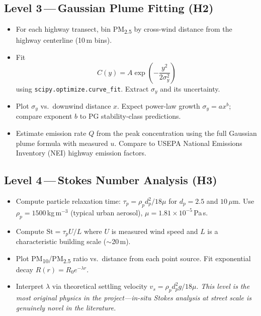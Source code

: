 \documentclass[11pt, letterpaper]{article}
\begin{document}
\subsection{Level 3\,---\,Gaussian Plume Fitting (H2)}
\begin{itemize}
  \item For each highway transect, bin PM\textsubscript{2.5} by cross-wind distance from the highway centerline (10\,m bins).
  \item Fit
  \[
    C(y) = A \exp\!\left(-\frac{y^2}{2\sigma_y^2}\right)
  \]
  using \texttt{scipy.optimize.curve\_fit}. Extract $\sigma_y$ and its uncertainty.
  \item Plot $\sigma_y$ vs.\ downwind distance $x$. Expect power-law growth $\sigma_y = ax^b$; compare exponent $b$ to PG stability-class predictions.
  \item Estimate emission rate $Q$ from the peak concentration using the full Gaussian plume formula with measured $u$. Compare to USEPA National Emissions Inventory (NEI) highway emission factors.
\end{itemize}

\subsection{Level 4\,---\,Stokes Number Analysis (H3)}
\begin{itemize}
  \item Compute particle relaxation time: $\tau_p = \rho_p d_p^2 / 18\mu$ for $d_p = 2.5$ and $10\,\mu$m. Use $\rho_p = 1500$\,kg\,m$^{-3}$ (typical urban aerosol), $\mu = 1.81\times10^{-5}$\,Pa\,s.
  \item Compute $\mathrm{St} = \tau_p U / L$ where $U$ is measured wind speed and $L$ is a characteristic building scale ($\sim$20\,m).
  \item Plot PM\textsubscript{10}/PM\textsubscript{2.5} ratio vs.\ distance from each point source. Fit exponential decay $R(r) = R_0 e^{-\lambda r}$.
  \item Interpret $\lambda$ via theoretical settling velocity $v_s = \rho_p d_p^2 g / 18\mu$. \textit{This level is the most original physics in the project---in-situ Stokes analysis at street scale is genuinely novel in the literature.}
\end{itemize}

\end{document}
